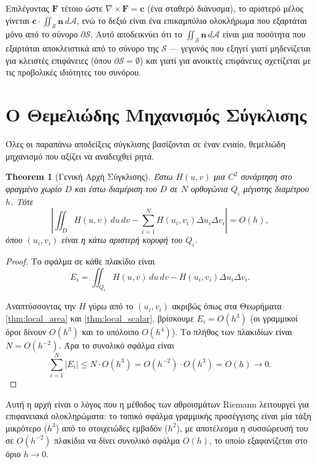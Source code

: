 \documentclass[10pt,a4paper,twoside,openany]{book}
\theoremstyle{plain}
\newtheorem{theorem}{Theorem}[section]
\theoremstyle{definition}
\theoremstyle{remark}
\numberwithin{equation}{section}
\begin{document}
Επιλέγοντας \(\mathbf{F}\) τέτοιο ώστε \(\nabla \times \mathbf{F} = \mathbf{c}\) (ένα σταθερό διάνυσμα), το αριστερό μέλος γίνεται \(\mathbf{c} \cdot \iint_{\mathcal{S}} \mathbf{n} \, d\mathcal{A}\), ενώ το δεξιό είναι ένα επικαμπύλιο ολοκλήρωμα που εξαρτάται μόνο από το σύνορο \(\partial\mathcal{S}\). Αυτό αποδεικνύει ότι το \(\iint_{\mathcal{S}} \mathbf{n} \, d\mathcal{A}\) είναι μια ποσότητα που εξαρτάται αποκλειστικά από το σύνορο της \(\mathcal{S}\) --- γεγονός που εξηγεί γιατί μηδενίζεται για κλειστές επιφάνειες (όπου \(\partial\mathcal{S} = \emptyset\)) και γιατί για ανοικτές επιφάνειες σχετίζεται με τις προβολικές ιδιότητες του συνόρου.

\section{Ο Θεμελιώδης Μηχανισμός Σύγκλισης}

Όλες οι παραπάνω αποδείξεις σύγκλισης βασίζονται σε έναν ενιαίο, θεμελιώδη μηχανισμό που αξίζει να αναδειχθεί ρητά.

\begin{theorem}[Γενική Αρχή Σύγκλισης]
\label{thm:general_principle}
Έστω \(H(u,v)\) μια \(C^2\) συνάρτηση στο φραγμένο χωρίο \(D\) και έστω διαμέριση του \(D\) σε \(N\) ορθογώνια \(Q_i\) μέγιστης διαμέτρου \(h\). Τότε
\[
\left| \iint_D H(u,v) \, du \, dv - \sum_{i=1}^N H(u_i, v_i) \Delta u_i \Delta v_i \right| = O(h),
\]
όπου \((u_i, v_i)\) είναι η κάτω αριστερή κορυφή του \(Q_i\).
\end{theorem}

\begin{proof}
Το σφάλμα σε κάθε πλακίδιο είναι
\[
E_i = \iint_{Q_i} H(u,v) \, du \, dv - H(u_i, v_i) \Delta u_i \Delta v_i.
\]

Αναπτύσσοντας την \(H\) γύρω από το \((u_i, v_i)\) ακριβώς όπως στα Θεωρήματα \ref{thm:local_area} και \ref{thm:local_scalar}, βρίσκουμε \(E_i = O(h^3)\) (οι γραμμικοί όροι δίνουν \(O(h^3)\) και το υπόλοιπο \(O(h^4)\)). Το πλήθος των πλακιδίων είναι \(N = O(h^{-2})\). Άρα το συνολικό σφάλμα είναι
\[
\sum_{i=1}^N |E_i| \le N \cdot O(h^3) = O(h^{-2}) \cdot O(h^3) = O(h) \to 0.
\]
\end{proof}

Αυτή η αρχή είναι ο λόγος που η μέθοδος των αθροισμάτων Riemann λειτουργεί για επιφανειακά ολοκληρώματα: το τοπικό σφάλμα γραμμικής προσέγγισης είναι μία τάξη μικρότερο (\(h^3\)) από το στοιχειώδες εμβαδόν (\(h^2\)), με αποτέλεσμα η συσσώρευσή του σε \(O(h^{-2})\) πλακίδια να δίνει συνολικό σφάλμα \(O(h)\), το οποίο εξαφανίζεται στο όριο \(h \to 0\).
\end{document}
